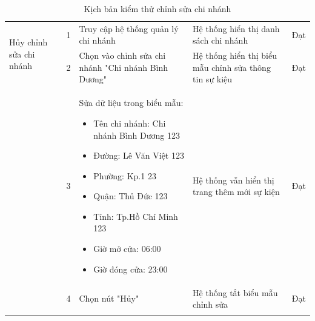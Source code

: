 {\begin{longtable}{| p{2.5cm}| p{1cm}| p{5.5cm}| p{4.5cm} | p{1.5cm} |}
        \hline
        \multirow[t]{2}{2.5cm}{Hủy chỉnh sửa chi nhánh} & 1                                            & Truy cập hệ thống quản lý chi nhánh                 & Hệ thống hiển thị danh sách chi nhánh                    & Đạt             \\
        \cline{2-5}
                                                        & 2                                            & Chọn vào chỉnh sửa chi nhánh "Chi nhánh Bình Dương" & Hệ thống hiển thị biểu mẫu chỉnh sửa thông tin sự kiệu   & Đạt             \\
        \cline{2-5}
                                                        & 3                                            & Sửa dữ liệu trong biểu mẫu:
        \begin{itemize}
            \item Tên chi nhánh: Chi nhánh Bình Dương 123
            \item Đường: Lê Văn Việt 123
            \item Phường: Kp.1 23
            \item Quận: Thủ Đức 123
            \item Tỉnh: Tp.Hồ Chí Minh 123
            \item Giờ mở cửa: 06:00
            \item Giờ đóng cửa: 23:00
        \end{itemize}   & Hệ thống vẫn hiển thị trang thêm mới sự kiện & Đạt                                                                                                                                                              \\
        \cline{2-5}
                                                        & 4                                            & Chọn nút "Hủy"                                      & Hệ thống tắt biểu mẫu chỉnh sửa                          & Đạt             \\
        \hline
        \caption{Kịch bản kiểm thử chỉnh sửa chi nhánh}
    \end{longtable}
}

